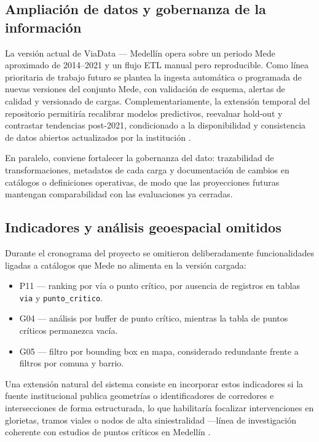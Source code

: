 \subsection{Ampliación de datos y gobernanza de la información}

La versión actual de ViaData — Medellín opera sobre un periodo Mede aproximado de 2014--2021 y un flujo ETL manual pero reproducible. Como línea prioritaria de trabajo futuro se plantea la ingesta automática o programada de nuevas versiones del conjunto Mede, con validación de esquema, alertas de calidad y versionado de cargas. Complementariamente, la extensión temporal del repositorio permitiría recalibrar modelos predictivos, reevaluar hold-out y contrastar tendencias post-2021, condicionado a la disponibilidad y consistencia de datos abiertos actualizados por la institución \cite{atancuri2024,oviedo2025}.

En paralelo, conviene fortalecer la gobernanza del dato: trazabilidad de transformaciones, metadatos de cada carga y documentación de cambios en catálogos o definiciones operativas, de modo que las proyecciones futuras mantengan comparabilidad con las evaluaciones ya cerradas.

\subsection{Indicadores y análisis geoespacial omitidos}

Durante el cronograma del proyecto se omitieron deliberadamente funcionalidades ligadas a catálogos que Mede no alimenta en la versión cargada:

\begin{itemize}
	\item P11 — ranking por vía o punto crítico, por ausencia de registros en tablas \texttt{via} y \texttt{punto\_critico}.
	\item G04 — análisis por buffer de punto crítico, mientras la tabla de puntos críticos permanezca vacía.
	\item G05 — filtro por bounding box en mapa, considerado redundante frente a filtros por comuna y barrio.
\end{itemize}

Una extensión natural del sistema consiste en incorporar estos indicadores si la fuente institucional publica geometrías o identificadores de corredores e intersecciones de forma estructurada, lo que habilitaría focalizar intervenciones en glorietas, tramos viales o nodos de alta siniestralidad ---línea de investigación coherente con estudios de puntos críticos en Medellín \cite{viveros2022,xu2022}.

